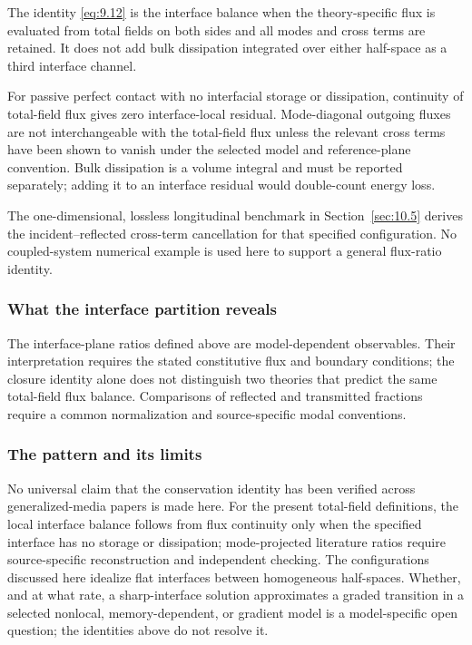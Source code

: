 The identity \eqref{eq:9.12} is the interface balance when the theory-specific flux is evaluated from total fields on both sides and all modes and cross terms are retained. It does not add bulk dissipation integrated over either half-space as a third interface channel.

For passive perfect contact with no interfacial storage or dissipation, continuity of total-field flux gives zero interface-local residual. Mode-diagonal outgoing fluxes are not interchangeable with the total-field flux unless the relevant cross terms have been shown to vanish under the selected model and reference-plane convention. Bulk dissipation is a volume integral and must be reported separately; adding it to an interface residual would double-count energy loss.

The one-dimensional, lossless longitudinal benchmark in Section~\ref{sec:10.5} derives the incident--reflected cross-term cancellation for that specified configuration. No coupled-system numerical example is used here to support a general flux-ratio identity.

\subsubsection{What the interface partition reveals}

The interface-plane ratios defined above are model-dependent observables. Their interpretation requires the stated constitutive flux and boundary conditions; the closure identity alone does not distinguish two theories that predict the same total-field flux balance. Comparisons of reflected and transmitted fractions require a common normalization and source-specific modal conventions.



\subsubsection{The pattern and its limits}

No universal claim that the conservation identity has been verified across generalized-media papers is made here. For the present total-field definitions, the local interface balance follows from flux continuity only when the specified interface has no storage or dissipation; mode-projected literature ratios require source-specific reconstruction and independent checking. The configurations discussed here idealize flat interfaces between homogeneous half-spaces. Whether, and at what rate, a sharp-interface solution approximates a graded transition in a selected nonlocal, memory-dependent, or gradient model is a model-specific open question; the identities above do not resolve it.

